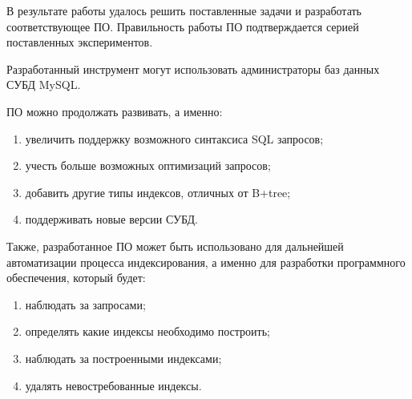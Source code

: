 \Conclusion

В результате работы удалось решить поставленные задачи и разработать соответствующее ПО. Правильность работы ПО подтверждается серией поставленных экспериментов. 

Разработанный инструмент могут использовать администраторы баз данных СУБД MySQL. 

ПО можно продолжать развивать, а именно:
\begin{enumerate}
\item увеличить поддержку возможного синтаксиса SQL запросов;
\item учесть больше возможных оптимизаций запросов;
\item добавить другие типы индексов, отличных от B+tree;
\item поддерживать новые версии СУБД.
\end{enumerate}

Также, разработанное ПО может быть использовано для дальнейшей автоматизации процесса индексирования, а именно для разработки программного обеспечения, который будет:
\begin{enumerate}
\item наблюдать за запросами;
\item определять какие индексы необходимо построить;
\item наблюдать за построенными индексами;
\item удалять невостребованные индексы.
\end{enumerate}